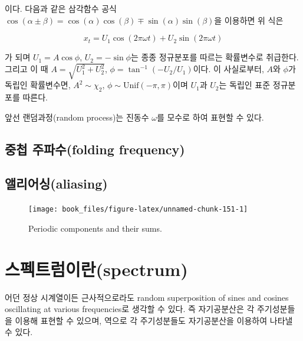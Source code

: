 \documentclass[b5paper,]{scrbook}
\theoremstyle{plain}
\theoremstyle{definition}
\numberwithin{equation}{section}
\let\BeginKnitrBlock\begin \let\EndKnitrBlock\end
\begin{document}
이다. 다음과 같은 삼각함수 공식
\(\cos (\alpha \pm \beta)= \cos (\alpha) \cos (\beta) \mp \sin(\alpha)\sin(\beta)\)을
이용하면 위 식은

\begin{equation}\label{eq:periodrp}
x_{t}=U_{1}\cos(2\pi\omega t) + U_{2}\sin(2\pi\omega t)
\end{equation}

가 되며 \(U_{1}=A\cos \phi\), \(U_{2}=-\sin\phi\)는 종종 정규분포를
따르는 확률변수로 취급한다. 그리고 이 때
\(A=\sqrt{U_{1}^{2}+U_{2}^{2}}\), \(\phi=\tan^{-1}(-U_{2}/U_{1})\)이다.
이 사실로부터, \(A\)와 \(\phi\)가 독립인 확률변수면,
\(A^{2}\sim \chi_{2}\), \(\phi \sim \text{Unif}(-\pi, \pi)\)이며
\(U_{1}\)과 \(U_{2}\)는 독립인 표준 정규분포를 따른다.

앞선 랜덤과정(random process)는 진동수 \(\omega\)를 모수로 하여 표현할
수 있다.

\subsection{중첩 주파수(folding frequency)}\label{-folding-frequency}

\subsection{앨리어싱(aliasing)}\label{aliasing}

\begin{figure}

{\centering \texttt{[image: book\_files/figure-latex/unnamed-chunk-151-1]} 

}

\caption{Periodic components and their sums.}\label{fig:unnamed-chunk-151}
\end{figure}

\section{스펙트럼이란(spectrum)}\label{spectrum}

\BeginKnitrBlock{theorem}[정상과정의 스펙트럼 표현]
\protect\hypertarget{thm:unnamed-chunk-152}{}{\label{thm:unnamed-chunk-152}
{} } 어던 정상 시계열이든
근사적으로라도 random superposition of sines and cosines oscillating at
various frequencies로 생각할 수 있다. 즉 자기공분산은 각 주기성분들을
이용해 표현할 수 있으며, 역으로 각 주기성분들도 자기공분산을 이용하여
나타낼 수 있다.
\EndKnitrBlock{theorem}
\end{document}
